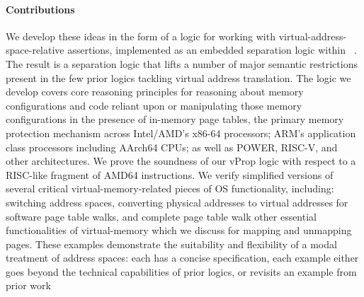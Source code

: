 \paragraph{Contributions}
We develop these ideas in the form of a logic for working with virtual-address-space-relative assertions,
implemented as an embedded separation logic within ~\cite{jung2018iris}.
The result is a separation logic that lifts a number of major semantic restrictions present in the few
prior logics tackling virtual address translation.
The logic we develop covers core reasoning principles for reasoning about memory configurations and code
reliant upon or manipulating those memory configurations in the presence of in-memory page tables, the primary
memory protection mechanism across Intel/AMD's x86-64 processors; ARM's application class processors including
AArch64 CPUs; as well as POWER, RISC-V, and other architectures.
We prove the soundness of our \textsf{vProp} logic with respect to a RISC-like fragment of \textsf{AMD64} instructions.
We verify simplified versions of several critical virtual-memory-related pieces of OS functionality, 
including:
switching address spaces, converting physical addresses to virtual addresses for
software page table walks, and  complete  page table walk  other essential functionalities of
virtual-memory which we discuss for mapping and unmapping pages. 
These examples demonstrate the suitability and flexibility of
a modal treatment of address spaces: each has a concise specification, each example either goes beyond the technical
capabilities of prior logics, or revisits an example from prior work

